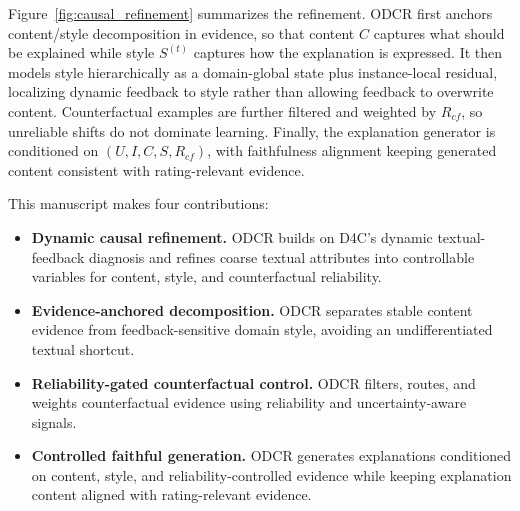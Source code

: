 Figure~\ref{fig:causal_refinement} summarizes the refinement. ODCR first
anchors content/style decomposition in evidence, so that content \(C\) captures
what should be explained while style \(S^{(t)}\) captures how the explanation
is expressed. It then models style hierarchically as a domain-global state plus
instance-local residual, localizing dynamic feedback to style rather than
allowing feedback to overwrite content. Counterfactual examples are further
filtered and weighted by \(R_{cf}\), so unreliable shifts do not dominate
learning. Finally, the explanation generator is conditioned on
\((U,I,C,S,R_{cf})\), with faithfulness alignment keeping generated content
consistent with rating-relevant evidence.

This manuscript makes four contributions:
\begin{itemize}
  \item \textbf{Dynamic causal refinement.} ODCR builds on D4C's dynamic
  textual-feedback diagnosis and refines coarse textual attributes into
  controllable variables for content, style, and counterfactual reliability.
  \item \textbf{Evidence-anchored decomposition.} ODCR separates stable
  content evidence from feedback-sensitive domain style, avoiding an
  undifferentiated textual shortcut.
  \item \textbf{Reliability-gated counterfactual control.} ODCR filters,
  routes, and weights counterfactual evidence using reliability and
  uncertainty-aware signals.
  \item \textbf{Controlled faithful generation.} ODCR generates explanations
  conditioned on content, style, and reliability-controlled evidence while
  keeping explanation content aligned with rating-relevant evidence.
\end{itemize}
